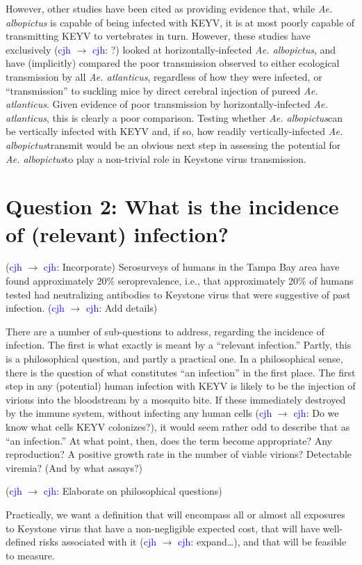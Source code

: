 \documentclass{article}
\newcommand{\alb}{\textit{Ae. albopictus}}
\newcommand{\atl}{\textit{Ae. atlanticus}}
\newcommand{\cjh}{\textcolor{blue}{cjh}}
\newcommand{\msg}[3]{(#1 $\rightarrow$ #2: #3)}
\newcommand{\mcc}[1]{\msg\cjh\cjh{#1}}
\begin{document}
            However, other studies have been cited as providing evidence that, while \textit{Ae. albopictus} is capable of being infected with KEYV, it is at most poorly capable of transmitting KEYV to vertebrates in turn. However, these studies have exclusively \mcc{?} looked at horizontally-infected \alb, and have (implicitly) compared the poor transmission observed to either ecological transmission by all \atl, regardless of how they were infected, or ``transmission'' to suckling mice by direct cerebral injection of pureed \atl. Given evidence of poor transmission by horizontally-infected \atl, this is clearly a poor comparison. Testing whether \alb can be vertically infected with KEYV and, if so, how readily vertically-infected \alb transmit would be an obvious next step in assessing the potential for \alb to play a non-trivial role in Keystone virus transmission.


    \section[Incidence of infection]{Question 2: What is the incidence of (relevant) infection?}

        \mcc{Incorporate} Serosurveys of humans in the Tampa Bay area have found approximately 20\% seroprevalence, i.e., that approximately 20\% of humans tested had neutralizing antibodies to Keystone virus that were suggestive of past infection.
            \mcc{Add details}

        There are a number of sub-questions to address, regarding the incidence of infection. The first is what exactly is meant by a ``relevant infection.'' Partly, this is a philosophical question, and partly a practical one. In a philosophical sense, there is the question of what constitutes ``an infection'' in the first place. The first step in any (potential) human infection with KEYV is likely to be the injection of virions into the bloodstream by a mosquito bite. If these immediately destroyed by the immune system, without infecting any human cells \mcc{Do we know what cells KEYV colonizes?}, it would seem rather odd to describe that as ``an infection.'' At what point, then, does the term become appropriate? Any reproduction? A positive growth rate in the number of viable virions? Detectable viremia? (And by what assays?)

        \mcc{Elaborate on philosophical questions} 
        
        Practically, we want a definition that will encompass all or almost all exposures to Keystone virus that have a non-negligible expected cost, that will have well-defined risks associated with it \mcc{expand\dots}, and that will be feasible to measure.
\end{document}
